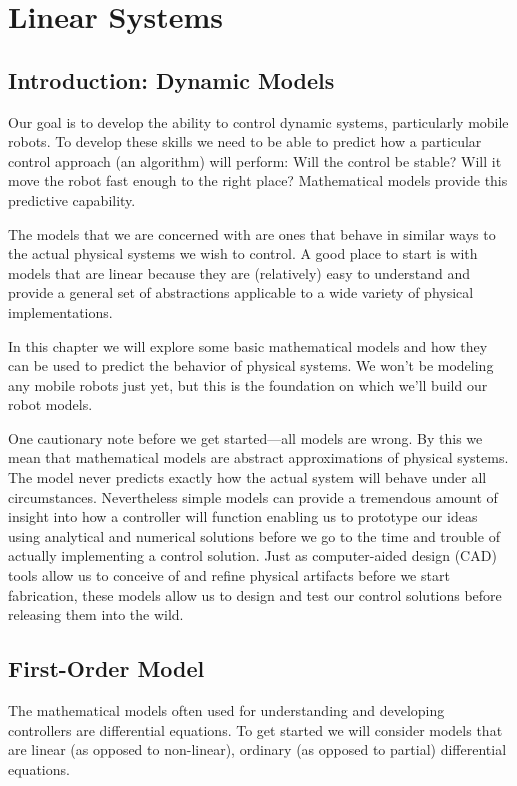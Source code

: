 \chapter{Linear Systems}\label{c:linsys}
\section{Introduction: Dynamic Models}
Our goal is to develop the ability to control dynamic systems, particularly mobile robots.  To develop these skills we need to be able to predict how a particular control approach (an algorithm) will perform: Will the control be stable?  Will it move the robot fast enough to the right place?  Mathematical models provide this predictive capability.  

The models that we are concerned with are ones that behave in similar ways to the actual physical systems we wish to control.  A good place to start is with models that are linear because they are (relatively) easy to understand and provide a general set of abstractions applicable to a wide variety of physical implementations.

In this chapter we will explore some basic mathematical models and how they can be used to predict the behavior of physical systems.  We won't be modeling any mobile robots just yet, but this is the foundation on which we'll build our robot models.

One cautionary note before we get started---all models are wrong.  By this we mean that mathematical models are abstract approximations of physical systems.  The model never predicts exactly how the actual system will behave under all circumstances.  Nevertheless simple models can provide a tremendous amount of insight into how a controller will function enabling us to prototype our ideas using analytical and numerical solutions before we go to the time and trouble of actually implementing a control solution.  Just as computer-aided design (CAD) tools allow us to conceive of and refine physical artifacts before we start fabrication, these models allow us to design and test our control solutions before releasing them into the wild.

\section{First-Order Model}
The mathematical models often used for understanding and developing controllers are differential equations.  To get started we will consider models that are linear (as opposed to non-linear), ordinary (as opposed to partial) differential equations.  

